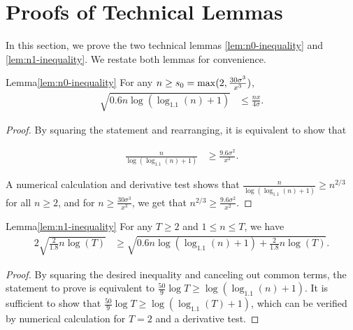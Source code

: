 \section{Proofs of Technical Lemmas}
\label{sec:n0-inequality-proof}
\label{sec:n1-inquality-proof}

In this section, we prove the two technical lemmas
\ref{lem:n0-inequality} and \ref{lem:n1-inequality}.
We restate both lemmas for convenience.


\begin{rtheorem}{Lemma}{\ref{lem:n0-inequality}}
For any $n \geq s_0 = \max (2, \frac{30 \sigma^3}{x^3})$, 
\begin{align*}
\sqrt{0.6 n \log (\log_{1.1}(n) + 1)} & \leq \frac{n x}{4 \sigma}. 
\end{align*}
\end{rtheorem}

\begin{proof}
By squaring the statement and rearranging, it is equivalent to show that

\begin{align*}
\frac{n}{\log(\log_{1.1}(n)+1)}
  & \geq \frac{9.6\sigma^2}{x^2}.
\end{align*}

A numerical calculation and derivative test shows that
$\frac{n}{\log(\log_{1.1}(n)+1)} \geq n^{2/3}$ for all $n \geq 2$,
and for $n \geq \frac{30 \sigma^3}{x^3}$, we get that
$n^{2/3} \geq \frac{9.6 \sigma^2}{x^2}$.
\end{proof}


\begin{rtheorem}{Lemma}{\ref{lem:n1-inequality}}
For any $T \geq 2$ and $1 \leq n \leq T$, we have
\begin{align*}
2\sqrt{\frac{2}{1.8} n \log(T)}
& \geq \sqrt{0.6 n \log(\log_{1.1}(n)+1) + \frac{2}{1.8} n \log(T)}.
\end{align*}
\end{rtheorem}

\begin{proof}
By squaring the desired inequality and canceling out common terms, the
statement to prove is equivalent to
$\frac{50}{9} \log T \geq \log(\log_{1.1}(n) + 1)$.
It is sufficient to show that
$\frac{50}{9} \log T \geq \log(\log_{1.1}(T) + 1)$,
which can be verified by numerical calculation for $T=2$ and a
derivative test.
\end{proof}
